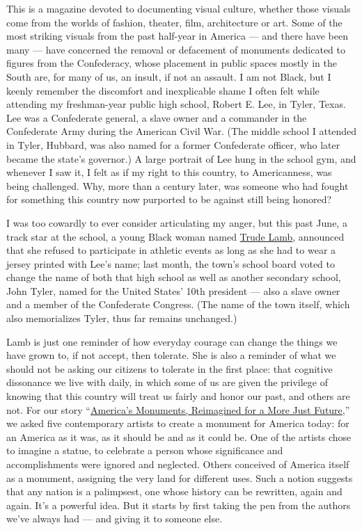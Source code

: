 This is a magazine devoted to documenting visual culture, whether those
visuals come from the worlds of fashion, theater, film, architecture or
art. Some of the most striking visuals from the past half-year in
America --- and there have been many --- have concerned the removal or
defacement of monuments dedicated to figures from the Confederacy, whose
placement in public spaces mostly in the South are, for many of us, an
insult, if not an assault. I am not Black, but I keenly remember the
discomfort and inexplicable shame I often felt while attending my
freshman-year public high school, Robert E. Lee, in Tyler, Texas. Lee
was a Confederate general, a slave owner and a commander in the
Confederate Army during the American Civil War. (The middle school I
attended in Tyler, Hubbard, was also named for a former Confederate
officer, who later became the state's governor.) A large portrait of Lee
hung in the school gym, and whenever I saw it, I felt as if my right to
this country, to Americanness, was being challenged. Why, more than a
century later, was someone who had fought for something this country now
purported to be against still being honored?

I was too cowardly to ever consider articulating my anger, but this past
June, a track star at the school, a young Black woman named
\href{https://www.cnn.com/2020/06/24/us/robert-e-lee-high-school-tyler-texas-trnd/index.html}{Trude
Lamb}, announced that she refused to participate in athletic events as
long as she had to wear a jersey printed with Lee's name; last month,
the town's school board voted to change the name of both that high
school as well as another secondary school, John Tyler, named for the
United States' 10th president --- also a slave owner and a member of the
Confederate Congress. (The name of the town itself, which also
memorializes Tyler, thus far remains unchanged.)

Lamb is just one reminder of how everyday courage can change the things
we have grown to, if not accept, then tolerate. She is also a reminder
of what we should not be asking our citizens to tolerate in the first
place: that cognitive dissonance we live with daily, in which some of us
are given the privilege of knowing that this country will treat us
fairly and honor our past, and others are not. For our story
``\href{https://www.nytimes3xbfgragh.onion/2020/08/24/t-magazine/confederate-monuments-reimagined-racism.html}{America's
Monuments, Reimagined for a More Just Future},'' we asked five
contemporary artists to create a monument for America today: for an
America as it was, as it should be and as it could be. One of the
artists chose to imagine a statue, to celebrate a person whose
significance and accomplishments were ignored and neglected. Others
conceived of America itself as a monument, assigning the very land for
different uses. Such a notion suggests that any nation is a palimpsest,
one whose history can be rewritten, again and again. It's a powerful
idea. But it starts by first taking the pen from the authors we've
always had --- and giving it to someone else.

